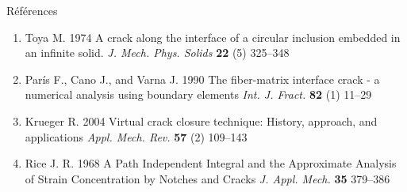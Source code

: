 \documentclass[final]{beamer}
\begin{document}
\begin{frame}
\begin{center}
\begin{minipage}{\textwidth}
\begin{columns}[totalwidth=0.925\textwidth]
\begin{column}{0.5\textwidth}
\begin{block}{\rule[-0.6ex]{0pt}{50pt}\centering R\'ef\'erences}
\begin{enumerate}
\item[{[}4{]}] Toya M. 1974 A crack along the interface of a circular inclusion embedded in an infinite solid. {\it \scriptsize J. Mech. Phys. Solids} {\bf \scriptsize 22} (5) 325--348
\item[{[}5{]}] Par\'is F., Cano J., and Varna J. 1990 The fiber-matrix interface crack - a numerical analysis using boundary elements {\it \scriptsize  Int. J. Fract.} {\bf \scriptsize 82} (1) 11--29
\item[{[}6{]}] Krueger R. 2004 Virtual crack closure technique: History, approach, and applications {\it\scriptsize Appl. Mech. Rev.} {\bf\scriptsize 57} (2) 109--143
\item[{[}7{]}] Rice J. R. 1968 A Path Independent Integral and the Approximate Analysis of Strain Concentration by Notches and Cracks {\it\scriptsize J. Appl. Mech.} {\bf\scriptsize 35} 379--386
\end{enumerate}
\end{block}
\end{column}
\end{columns}
\end{minipage}
\end{center}

\end{frame}
\end{document}
